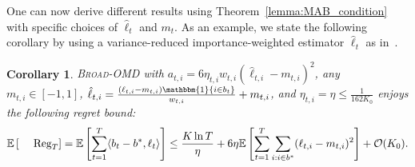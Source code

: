 \documentclass[final, 12pt]{colt2018} %
\newcommand{\inn}[1]{ \langle {#1} \rangle }
\newcommand{\reg}{\text{\rm Reg}}
\newtheorem{cor}[theorem]{Corollary}
\begin{document}
One can now derive different results using Theorem~\ref{lemma:MAB_condition} with specific choices of $\hat{\ell}_t$ and $m_t$.
As an example, we state the following corollary by using a variance-reduced importance-weighted estimator $\hat{\ell}_t$ as in~\citep{rakhlin2013online}.
\begin{cor}
\label{cor:clear_corollary}
\textsc{Broad-OMD} with $a_{t,i}=6\eta_{t,i}w_{t,i}(\hat{\ell}_{t,i}-m_{t,i})^2$, any $m_{t,i} \in [-1, 1]$, $\hat{\ell}_{t,i}=\frac{(\ell_{t,i}-m_{t,i})\mathbbm{1}\{i\in b_t\}}{w_{t,i}}+m_{t,i}$, and \sloppy $\eta_{t,i}=\eta \leq \frac{1}{162K_0}$ enjoys the following regret bound:
\begin{align*}
\mathbb{E}\left[\reg_T\right]= \mathbb{E}\left[ \sum_{t=1}^T \inn{b_t-b^*, \ell_t} \right] \leq \frac{K\ln T}{\eta} + 6\eta\mathbb{E}\left[\sum_{t=1}^T \sum_{i: i\in b^*} (\ell_{t,i}-m_{t,i})^2\right] +\mathcal{O}(K_0). 
\end{align*}
\end{cor}
\end{document}

